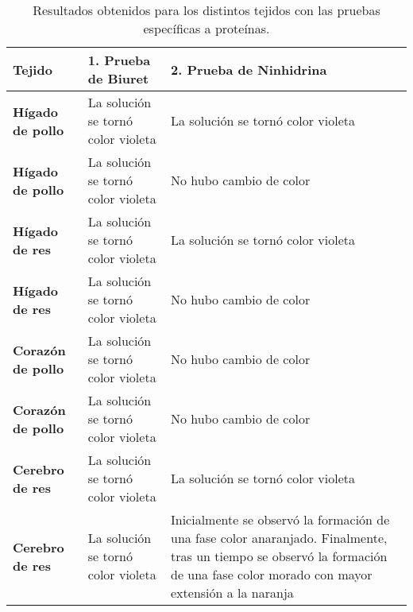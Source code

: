 \begin{table}[h!]
	\small
	\caption{Resultados obtenidos para los distintos tejidos con las pruebas espec\'ificas a prote\'inas.}
	\label{tb: proteinas}
	\begin{tabular}{p{1.5cm}|p{2.6cm}p{3.5cm}}
		\hline
		\textbf{Tejido} & \textbf{1. Prueba de Biuret} & \textbf{2. Prueba de Ninhidrina}
		\\
		\hline
		\textbf{H\'igado de pollo} & La solución se tornó color violeta & La solución se tornó color violeta
		\\
		\hline
		\textbf{H\'igado de pollo} & La solución se tornó color violeta & No hubo cambio de color
		\\
		\hline
		
		\textbf{H\'igado de res} & La solución se tornó color violeta & La solución se tornó color violeta
		\\
		\hline
		
		\textbf{H\'igado de res} & La solución se tornó color violeta & No hubo cambio de color
		\\
		\hline
		
		\textbf{Coraz\'on de pollo} & La solución se tornó color violeta & No hubo cambio de color
		\\
		\hline
		
		\textbf{Coraz\'on de pollo} & La solución se tornó color violeta & No hubo cambio de color
		\\
		\hline
		
		\textbf{Cerebro de res} & La solución se tornó color violeta & La solución se tornó color violeta
		\\
		\hline
		\textbf{Cerebro de res} & La solución se tornó color violeta & Inicialmente se observó la formación de una fase color anaranjado. Finalmente, tras un tiempo se observó la formación de una fase color morado con mayor extensión a la naranja
		\\
		\hline
	\end{tabular}
\end{table}
